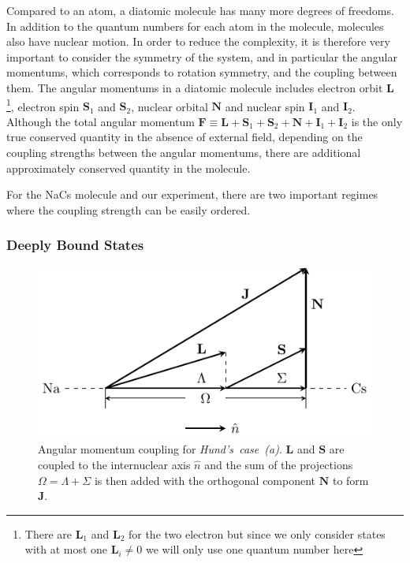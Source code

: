 Compared to an atom, a diatomic molecule has many more degrees of freedoms.
In addition to the quantum numbers for each atom in the molecule,
molecules also have nuclear motion.
In order to reduce the complexity, it is therefore very important to consider the
symmetry of the system, and in particular the angular momentums,
which corresponds to rotation symmetry, and the coupling between them.
The angular momentums in a diatomic molecule includes electron orbit $\mathbf{L}$
\footnote{There are $\mathbf{L}_1$ and $\mathbf{L}_2$ for the two electron but since
  we only consider states with at most one $\mathbf{L}_i\neq0$ we will only use one quantum number here},
electron spin $\mathbf{S}_1$ and $\mathbf{S}_2$, nuclear orbital $\mathbf{N}$
and nuclear spin $\mathbf{I}_1$ and $\mathbf{I}_2$.
Although the total angular momentum
$\mathbf{F}\equiv\mathbf{L}+\mathbf{S}_1+\mathbf{S}_2+\mathbf{N}+\mathbf{I}_1+\mathbf{I}_2$
is the only true conserved quantity in the absence of external field,
depending on the coupling strengths between the angular momentums,
there are additional approximately conserved quantity in the molecule.

For the NaCs molecule and our experiment, there are two important regimes where the coupling
strength can be easily ordered.

\subsubsection{Deeply Bound States}
\label{ch:pa:angular-momentums:deep}

\begin{figure}
  \centering
  \includegraphics[width=\textwidth]{figures/pa_hunds_case_a.pdf}
  \caption[Hund's~case~(a)]{
    Angular momentum coupling for \textit{Hund's~case~(a)}.
    $\mathbf{L}$ and $\mathbf{S}$ are coupled to the internuclear axis $\hat n$
    and the sum of the projections $\Omega=\Lambda+\Sigma$ is then
    added with the orthogonal component $\mathbf{N}$ to form $\mathbf{J}$.
    \label{fig:pa:hunds-case-a}}
\end{figure}

